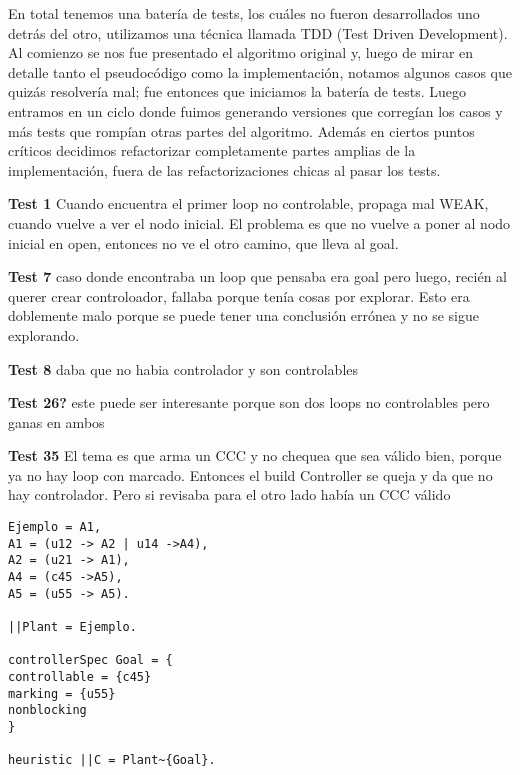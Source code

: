 En total tenemos una batería de \totalTests tests, los cuáles no fueron desarrollados uno detrás del otro, utilizamos una técnica llamada TDD (Test Driven Development). Al comienzo se nos fue presentado el algoritmo original y, luego de mirar en detalle tanto el pseudocódigo como la implementación, notamos algunos casos que quizás resolvería mal; fue entonces que iniciamos la batería de tests. 
Luego entramos en un ciclo donde fuimos generando versiones que corregían los casos y más tests que rompían otras partes del algoritmo. Además en ciertos puntos críticos decidimos refactorizar completamente partes amplias de la implementación, fuera de las refactorizaciones chicas al pasar los tests.

\bigskip

\textbf{Test 1}
Cuando encuentra el primer loop no controlable, propaga mal WEAK, cuando vuelve a ver el nodo inicial. El problema es que no vuelve a poner al nodo inicial en open, entonces no ve el otro camino, que lleva al goal.


\smallskip
\textbf{Test 7} caso donde encontraba un loop que pensaba era goal pero luego, recién al querer crear controloador, fallaba porque tenía cosas por explorar. Esto era doblemente malo porque se puede tener una conclusión errónea y no se sigue explorando.

\smallskip
\textbf{Test 8} daba que no habia controlador y son controlables

\smallskip
\textbf{Test 26?} este puede ser interesante porque son dos loops no controlables pero ganas en ambos

\smallskip
\textbf{Test 35} El tema es que arma un CCC y no chequea que sea válido bien, porque ya no hay loop con marcado. Entonces el build Controller se queja y da que no hay controlador. Pero si revisaba para el otro lado había un CCC válido

% 


\begin{lstlisting}[language = mtsa, caption=Test 1 a modo de ejemplo] 
Ejemplo = A1,
A1 = (u12 -> A2 | u14 ->A4),
A2 = (u21 -> A1),
A4 = (c45 ->A5),
A5 = (u55 -> A5).

||Plant = Ejemplo.

controllerSpec Goal = {
controllable = {c45}
marking = {u55}
nonblocking
}

heuristic ||C = Plant~{Goal}.
\end{lstlisting}
